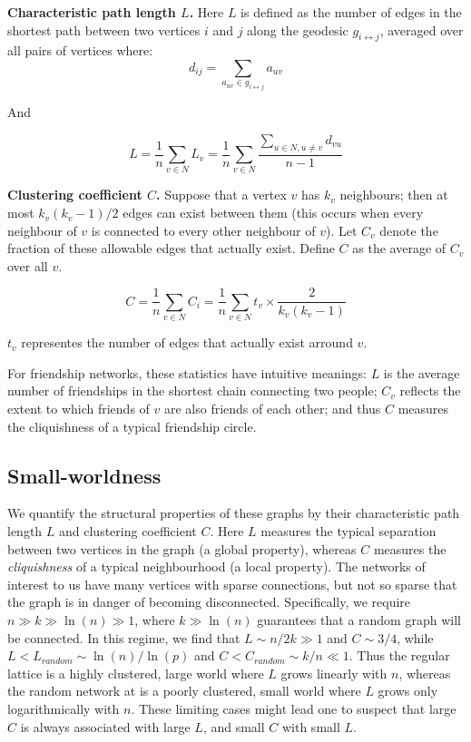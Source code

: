 \documentclass[final, paper=letter,5p,times,twocolumn]{elsarticle}
\begin{document}
\begin{definition}
  {\bf Characteristic path length $L$.} Here $L$ is defined as the number of edges in the shortest path between two vertices $i$ and $j$ along the geodesic $g_{i \leftrightarrow j}$, averaged over all pairs of vertices where:
  $$
  d_{ij} = \sum_{a_{uv} \in g_{i \leftrightarrow j}} a_{uv}
  $$

  And

  $$
  L = \frac{1}{n} \sum_{v \in N} L_{v} =  \frac{1}{n} \sum_{v \in N} \frac{\sum_{u \in N, u \ne v} d_{vu}}{n-1}
  $$
\end{definition}

\begin{definition}
  {\bf Clustering coefficient $C$.} Suppose that a vertex $v$ has $k_{v}$ neighbours; then at most $k_{v}(k_{v} -1)/2$ edges can exist between them (this occurs when every neighbour of $v$ is connected to every other neighbour of $v$). Let $C_{v}$ denote the fraction of these allowable edges that actually exist. Define $C$ as the average of $C_{v}$ over all $v$.

  $$
  C = \frac{1}{n} \sum_{v \in N} C_{i} = \frac{1}{n} \sum_{v \in N} t_{v} \times \frac{2}{k_{v}(k_{v} -1)}
  $$

  $t_{v}$ representes the number of edges that actually exist arround $v$.
\end{definition}

For friendship networks, these statistics have intuitive meanings: $L$ is the average number of friendships in the shortest chain connecting two people; $C_{v}$ reflects the extent to which friends of $v$ are also friends of each other; and thus $C$ measures the cliquishness of a typical friendship circle.

\subsection{Small-worldness}

We quantify the structural properties of these graphs by their characteristic path length $L$ and clustering coefficient $C$. Here $L$ measures the typical separation between two vertices in the graph (a global property), whereas $C$ measures the {\it cliquishness} of a typical neighbourhood (a local property). The networks of interest to us have many vertices with sparse connections, but not so sparse that the graph is in danger of becoming disconnected. Specifically, we require $n \gg k \gg \ln(n) \gg 1$, where $k \gg \ln(n)$ guarantees that a random graph will be connected. In this regime, we find that $L \sim n/2k \gg 1$ and $C \sim 3/4$, while $L < L_{random} \sim \ln(n) / \ln(p)$ and $C < C_{random} \sim k/n \ll 1$. Thus the regular lattice is a highly clustered, large world where $L$ grows linearly with $n$, whereas the random network at is a poorly clustered, small world where $L$ grows only logarithmically with $n$. These limiting cases might lead one to suspect that large $C$ is always associated with large $L$, and small $C$ with small $L$.
\end{document}
